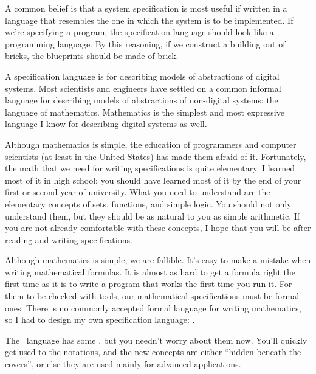 \documentclass[fleqn,leqno]{article}
\begin{document}
A common belief is that a system specification is most useful if 
written in a language that resembles the one in which the system is to
be implemented.  If we're specifying a program, the specification
language should look like a programming language.  By this reasoning,
if we construct a building out of bricks, the blueprints should be
made of brick.

A specification language is for describing models of abstractions of
digital systems.  Most scientists and engineers have settled on a
common informal language for describing models of abstractions of
non-digital systems: the language of mathematics.  Mathematics is the
simplest and most expressive language I know for describing digital
systems as well.  

Although mathematics is simple, the education of programmers and
computer scientists (at least in the United States) has made them
afraid of it.  Fortunately, the math that we need for writing
specifications is quite elementary.  I learned most of it in high
school; you should have learned most of it by the end of your first or
second year of university.  What you need to understand are the
elementary concepts of sets, functions, and simple logic.  You should
not only understand them, but they should be as natural to you as
simple arithmetic.  If you are not already comfortable with these
concepts, I hope that you will be after reading and writing
specifications.

Although mathematics is simple, we are fallible.  It's easy to make a
mistake when writing mathematical formulas.  It is almost as hard to
get a formula right the first time as it is to write a program that
works the first time you run it.  For them to be checked with tools,
our mathematical specifications must be formal ones.  There is no
commonly accepted formal language for writing mathematics, so I had to
design my own specification language: \tlaplus.

The \tlaplus\ language has some 
, but you needn't worry about them now.  You'll quickly get used
to the notations, and the new concepts are either ``hidden beneath the
covers'', or else they are used mainly for advanced applications.
\end{document}
